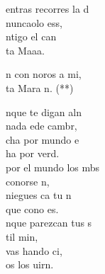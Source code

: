 \begin{cancion}%
	entras recorres la d \\
	 nuncaolo ess,\\
	ntigo  el can \\
	ta Maaa.\jump\\
	\begin{chorus}%
		n con noros a mi,\\
		ta Mara n. (**)\jump\\
	\end{chorus}%
	nque te digan aln \\
	 nada ede cambr,\\
	cha por mundo e \\
	ha por verd.\\
	\jump
	 por el mundo los mbs\\
	 conorse n,\\
	 niegues ca tu n \\
	que cono es.\\
	\jump
	nque parezcan tus s \\
	til min,\\
	 vas hando ci,\\
	os los uirn.\\
\end{cancion}%
